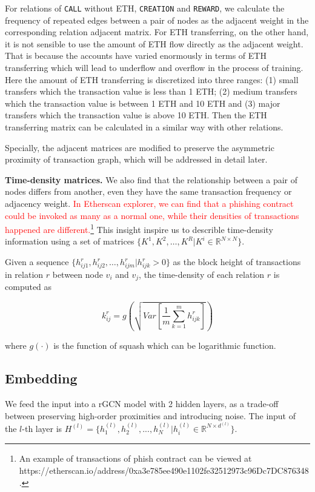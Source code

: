 For relations of \texttt{CALL} without ETH, \texttt{CREATION} and \texttt{REWARD}, we calculate the frequency of repeated edges between a pair of nodes as the adjacent weight in the corresponding relation adjacent matrix. For ETH transferring, on the other hand, it is not sensible to use the amount of ETH flow directly as the adjacent weight. That is because the accounts have varied enormously in terms of ETH transferring which will lead to underflow and overflow in the process of training. Here the amount of ETH transferring is discretized into three ranges: (1) small transfers which the transaction value is less than 1 ETH; (2) medium transfers which the transaction value is between 1 ETH and 10 ETH and (3) major transfers which the transaction value is above 10 ETH. Then the ETH transferring matrix can be calculated in a similar way with other relations.

Specially, the adjacent matrices are modified to preserve the asymmetric proximity of transaction graph, which will be addressed in detail later. 

\textbf{Time-density matrices.} We also find that the relationship between a pair of nodes differs from another, even they have the same transaction frequency or adjacency weight. \textcolor{red}{In Etherscan explorer, we can find that a phishing contract could be invoked as many as a normal one, while their densities of transactions happened are different.}\footnote{An example of transactions of phish contract can be viewed at https://etherscan.io/address/0xa3e785ee490e1102fe32512973c96Dc7DC876348.}
This insight inspire us to describle time-density information using a set of matrices $\{K^1,K^2,\dots,K^R|K^i\in \mathbb{R}^{N \times N}\}$. 

Given a sequence $\{h_{ij1}^r,h_{ij2}^r,\dots,h_{ijm}^r | h_{ijk}^r>0\}$ as the block height of transactions in relation $r$ between node $v_i$ and $v_j$, the time-density of each relation $r$ is computed as%

\begin{equation}
k_{ij}^r=g(\sqrt{Var[\frac{1}{m}\sum_{k=1}^m h_{ijk}^r]})
\label{eq:time}
\end{equation}

\noindent where $g(\cdot)$ is the function of squash which can be logarithmic function.

\subsection{Embedding}
\label{sec:rGCN layers}
 We feed the input into a rGCN model with 2 hidden layers, as a trade-off between preserving high-order proximities and introducing noise. The input of the $l$-th layer is $H^{(l)}=\{h_1^{(l)},h_2^{(l)},...,h_N^{(l)}|h_i^{(l)}\in \mathbb{R}^{N \times d^{(l)}}\}$.

